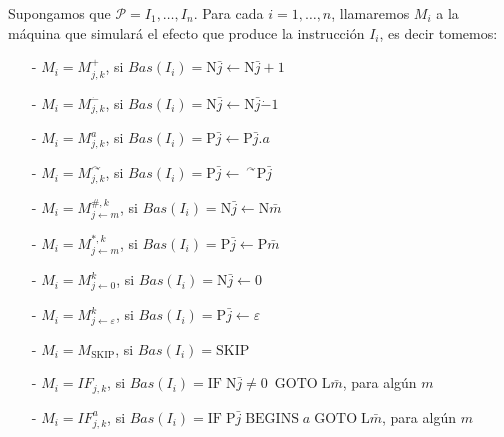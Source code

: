 \begin{frame}
  \begin{block}
    \PN Supongamos que $\mathcal{P} = I_{1}, \dotsc, I_{n}$. Para cada $i = 1, \dotsc, n$, llamaremos $M_{i}$ a la
    máquina que simulará el efecto que produce la instrucción $I_{i}$, es decir tomemos:
    \begin{enumerate}
      \item[-] $M_{i}=M_{j,k}^{+}$, si $Bas(I_{i})=\mathrm{N}\bar{j}\leftarrow
      \mathrm{N}\bar{j}+1$

      \item[-] $M_{i}=M_{j,k}^{\dot{-}}$, si $Bas(I_{i})=\mathrm{N}\bar{j}%
      \leftarrow \mathrm{N}\bar{j}\dot{-}1$

      \item[-] $M_{i}=M_{j,k}^{a}$, si $Bas(I_{i})=\mathrm{P}\bar{j}\leftarrow
      \mathrm{P}\bar{j}.a$

      \item[-] $M_{i}=M_{j,k}^{\curvearrowright }$, si $Bas(I_{i})=\mathrm{P}\bar{j%
      }\leftarrow \ ^{\curvearrowright }\mathrm{P}\bar{j}$

      \item[-] $M_{i}=M_{j\leftarrow m}^{\#,k}$, si $Bas(I_{i})=\mathrm{N}\bar{j}%
      \leftarrow \mathrm{N}\bar{m}$

      \item[-] $M_{i}=M_{j\leftarrow m}^{\ast ,k}$, si $Bas(I_{i})=\mathrm{P}\bar{j%
      }\leftarrow \mathrm{P}\bar{m}$

      \item[-] $M_{i}=M_{j\leftarrow 0}^{k}$, si $Bas(I_{i})=\mathrm{N}\bar{j}%
      \leftarrow 0$

      \item[-] $M_{i}=M_{j\leftarrow \varepsilon }^{k}$, si $Bas(I_{i})=\mathrm{P}%
      \bar{j}\leftarrow \varepsilon $

      \item[-] $M_{i}=M_{\mathrm{SKIP}}$, si $Bas(I_{i})=\mathrm{SKIP}$

      \item[-] $M_{i}=IF_{j,k}$, si $Bas(I_{i})=\mathrm{IF}\;\mathrm{N}\bar{j}%
      \not=0$\ $\mathrm{GOTO}\;\mathrm{L}\bar{m}$, para algún $m$

      \item[-] $M_{i}=IF_{j,k}^{a}$, si $Bas(I_{i})=\mathrm{IF}\;\mathrm{P}\bar{j}%
      \;\mathrm{BEGINS}\;a\;\mathrm{GOTO}\;\mathrm{L}\bar{m}$, para algún $m$
    \end{enumerate}
  \end{block}
\end{frame}
